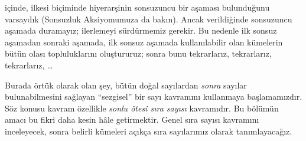 \documentclass[../../../include/open-logic-section]{subfiles}
\begin{document}


 içinde, \stagesinf{} ilkesi biçiminde hiyerarşinin
sonsuzuncu bir aşaması bulunduğunu varsaydık (Sonsuzluk Aksiyomumuza da
bakın). Ancak \stagessucc{} verildiğinde sonsuzuncu aşamada duramayız;
ilerlemeyi sürdürmemiz gerekir. Bu nedenle ilk sonsuz aşamadan sonraki
aşamada, ilk sonsuz aşamada kullanılabilir olan kümelerin bütün olası
topluluklarını oluştururuz; sonra bunu tekrarlarız, tekrarlarız,
tekrarlarız, \dots

Burada örtük olarak olan şey, bütün doğal sayılardan \emph{sonra} sayılar
bulunabilmesini sağlayan ``sezgisel'' bir sayı kavramını kullanmaya
başlamamızdır. Söz konusu kavram özellikle \emph{sonlu ötesi sıra sayısı}
kavramıdır. Bu bölümün amacı bu fikri daha kesin hâle getirmektir. Genel sıra
sayısı kavramını inceleyecek, sonra belirli kümeleri açıkça sıra sayılarımız
olarak tanımlayacağız.
\end{document}
